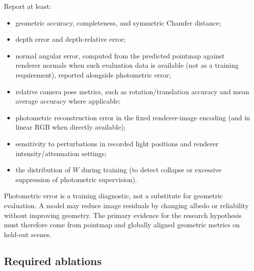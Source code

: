 \documentclass[11pt,a4paper]{article}
\begin{document}
Report at least:
\begin{itemize}
  \item geometric accuracy, completeness, and symmetric Chamfer distance;
  \item depth error and depth-relative error;
  \item normal angular error, computed from the predicted pointmap against
  renderer normals when such evaluation data is available (not as a
  training requirement), reported alongside photometric error;
  
  \item relative camera pose metrics, such as rotation/translation
  accuracy and mean average accuracy where applicable;
  \item photometric reconstruction error in the fixed renderer-image encoding
  (and in linear RGB when directly available);
  \item sensitivity to perturbations in recorded light positions and renderer
  intensity/attenuation settings;
  \item the distribution of $W$ during training (to detect collapse or
  excessive suppression of photometric supervision).
\end{itemize}
Photometric error is a training diagnostic, not a substitute for geometric
evaluation. A model may reduce image residuals by changing albedo or
reliability without improving geometry. The primary evidence for the
research hypothesis must therefore come from pointmap and globally aligned
geometric metrics on held-out scenes.

\subsection{Required ablations}
\end{document}
